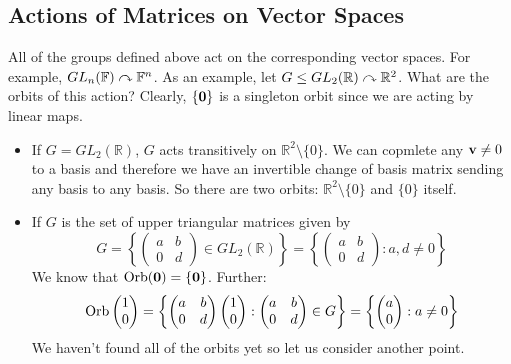 \subsection{Actions of Matrices on Vector Spaces}
All of the groups defined above act on the corresponding vector spaces.
For example, \(GL_n(\mathbb F) \curvearrowright \mathbb F^n\).
As an example, let \(G \leq GL_2(\mathbb R) \curvearrowright \mathbb R^2\).
What are the orbits of this action? Clearly, \(\{ \vb 0 \}\) is a singleton orbit since we are acting by linear maps.
\begin{itemize}
	\item If \(G = GL_2(\mathbb R)\), \(G\) acts transitively on \(\mathbb R^2 \setminus \{ 0 \}\).
	      We can copmlete any \(\vb v \neq 0\) to a basis and therefore we have an invertible change of basis matrix sending any basis to any basis.
	      So there are two orbits: \(\mathbb R^2 \setminus \{ 0 \}\) and \(\{ 0 \}\) itself.
	\item If \(G\) is the set of upper triangular matrices given by
	      \[
		      G = \left\{ \begin{pmatrix}
			      a & b \\ 0 & d
		      \end{pmatrix} \in GL_2(\mathbb R) \right\} = \left\{ \begin{pmatrix}
			      a & b \\ 0 & d
		      \end{pmatrix}: a, d \neq 0 \right\}
	      \]
	      We know that \(\operatorname{Orb}(\vb 0) = \{ \vb 0 \}\).
	      Further:
	      \[
		      \operatorname{Orb}\begin{pmatrix}
			      1 \\ 0
		      \end{pmatrix} = \left\{ \begin{pmatrix}
			      a & b \\ 0 & d
		      \end{pmatrix} \begin{pmatrix}
			      1 \\ 0
		      \end{pmatrix}: \begin{pmatrix}
			      a & b \\ 0 & d
		      \end{pmatrix} \in G \right\} = \left\{ \begin{pmatrix}
			      a \\ 0
		      \end{pmatrix}: a \neq 0 \right\}
	      \]
	      We haven't found all of the orbits yet so let us consider another point.

\end{itemize}
